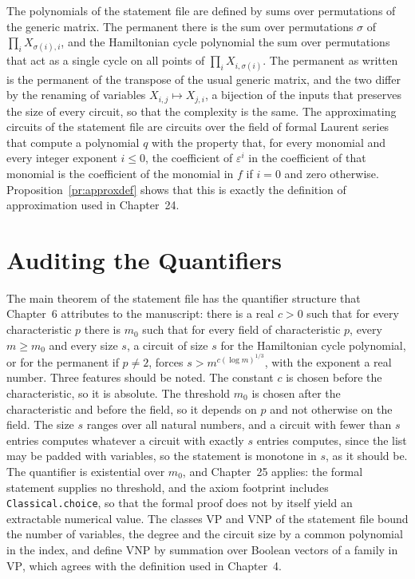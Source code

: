 \documentclass[11pt,letterpaper]{report}
\theoremstyle{plain}
\theoremstyle{definition}
\theoremstyle{remark}
\newcommand{\VP}{\mathrm{VP}}
\newcommand{\VNP}{\mathrm{VNP}}
\begin{document}
The polynomials of the statement file are defined by sums over permutations of the generic matrix. The permanent there is the sum over permutations $\sigma$ of $\prod_iX_{\sigma(i),i}$, and the Hamiltonian cycle polynomial the sum over permutations that act as a single cycle on all points of $\prod_iX_{i,\sigma(i)}$. The permanent as written is the permanent of the transpose of the usual generic matrix, and the two differ by the renaming of variables $X_{i,j}\mapsto X_{j,i}$, a bijection of the inputs that preserves the size of every circuit, so that the complexity is the same. The approximating circuits of the statement file are circuits over the field of formal Laurent series that compute a polynomial $q$ with the property that, for every monomial and every integer exponent $i\le0$, the coefficient of $\varepsilon^i$ in the coefficient of that monomial is the coefficient of the monomial in $f$ if $i=0$ and zero otherwise. Proposition~\ref{pr:approxdef} shows that this is exactly the definition of approximation used in Chapter~24.

\section{Auditing the Quantifiers}

The main theorem of the statement file has the quantifier structure that Chapter~6 attributes to the manuscript: there is a real $c>0$ such that for every characteristic $p$ there is $m_0$ such that for every field of characteristic $p$, every $m\ge m_0$ and every size $s$, a circuit of size $s$ for the Hamiltonian cycle polynomial, or for the permanent if $p\ne2$, forces $s>m^{c(\log m)^{1/3}}$, with the exponent a real number. Three features should be noted. The constant $c$ is chosen before the characteristic, so it is absolute. The threshold $m_0$ is chosen after the characteristic and before the field, so it depends on $p$ and not otherwise on the field. The size $s$ ranges over all natural numbers, and a circuit with fewer than $s$ entries computes whatever a circuit with exactly $s$ entries computes, since the list may be padded with variables, so the statement is monotone in $s$, as it should be. The quantifier is existential over $m_0$, and Chapter~25 applies: the formal statement supplies no threshold, and the axiom footprint includes \texttt{Classical.choice}, so that the formal proof does not by itself yield an extractable numerical value. The classes $\VP$ and $\VNP$ of the statement file bound the number of variables, the degree and the circuit size by a common polynomial in the index, and define $\VNP$ by summation over Boolean vectors of a family in $\VP$, which agrees with the definition used in Chapter~4.
\end{document}
